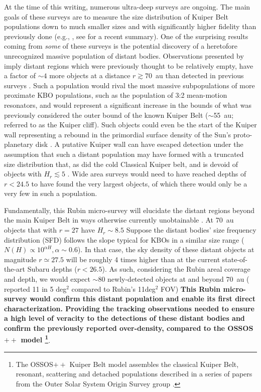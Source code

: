 \documentclass[modern,linenumbers,trackchanges,preprint]{aastex631}
\begin{document}
At the time of this writing, numerous ultra-deep surveys are ongoing. The main goals of these surveys are to measure the size distribution of Kuiper Belt populations down to much smaller sizes and with significantly higher fidelity than previously done (e.g., \citet{Smotherman2024}, see \citet{Lawler24} for a recent summary). 
One of the surprising results coming from \emph{some} of these surveys is the potential discovery of a heretofore unrecognized massive population of distant bodies. 
Observations presented by \citet{Fraser2024PSJ} imply distant regions which were previously thought to be relatively empty, have a factor of $\sim4$ more objects at a distance $r\gtrsim70$~au than detected in previous surveys \citep{Bannister2018}. 
Such a population would rival the most massive subpopulations of more proximate KBO populations, such as the population of 3:2 mean-motion resonators, and would represent a significant increase in the bounds of what was previously considered the outer bound of the known Kuiper Belt ($\sim$55~au;  referred to as the Kuiper cliff). Such objects could even be the start of the Kuiper wall representing a rebound in the primordial surface density of the Sun's proto-planetary disk \citep{Chiang1999}.
A putative Kuiper wall can have escaped detection under the assumption that such a distant population may have formed with a truncated size distribution that, as did the cold Classical Kuiper belt, and is devoid of objects with $H_r \lesssim 5$ \citep{Gladman2022, Peltier2022}.
Wide area surveys would need to have reached depths of  $r<24.5$ to have found the very largest objects, of which there would only be a very few in such a population. 

Fundamentally, this Rubin micro-survey will elucidate the distant regions beyond the main Kuiper Belt in ways otherwise currently unobtainable \citep{Kavelaars2020}. 
At 70~au objects that with $r=27$ have $H_r \sim 8.5$
Suppose the distant bodies' size frequency distribution (SFD) follows the slope typical for KBOs in a similar size range ($N(H) \propto 10^{\alpha H}, \alpha\sim0.6$). 
In that case, the sky density of these distant objects at magnitude $r\simeq27.5$ will be roughly 4 times higher than at the current state-of-the-art Subaru depths ($r<26.5$). 
As such, considering the Rubin areal coverage and depth, we would expect $\sim$80 newly-detected objects at and beyond 70~au (\citet{Fraser2024PSJ} reported 11 in 5 deg$^2$ compared to Rubin's 11deg$^2$ FOV) 
{\bf This Rubin micro-survey would confirm this distant population and enable its first direct characterization. 
Providing the tracking observations needed to ensure a high level of veracity to the detections of these distant bodies and confirm the previously reported over-density, compared to the OSSOS$++$ model \citep{Petit2023DPS}\footnote{The OSSOS$++$ Kuiper Belt model assembles the classical Kuiper Belt, resonant, scattering and detached populations described in a series of papers from the Outer Solar System Origin Survey group \citet{Bannister2018, Lawler2018, Kavelaars2021, Crompvoets2022, Petit2023, beaudoin2023}.}}. 
\end{document}
